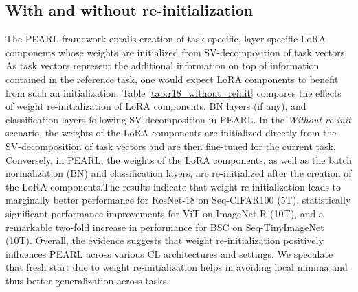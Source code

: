 \documentclass[10pt]{article} %
\begin{document}
\subsection{With and without re-initialization}\label{with_without_reinint} 
The PEARL framework entails creation of task-specific, layer-specific LoRA components whose weights are initialized from SV-decomposition of task vectors. As task vectors represent the additional information on top of information contained in the reference task, one would expect LoRA components to benefit from such an initialization. Table \ref{tab:r18_without_reinit} compares the effects of weight re-initialization of LoRA components, BN layers (if any), and classification layers following SV-decomposition in PEARL. In the \textit{Without re-init} scenario, the weights of the LoRA components are initialized directly from the SV-decomposition of task vectors and are then fine-tuned for the current task. Conversely, in PEARL, the weights of the LoRA components, as well as the batch normalization (BN) and classification layers, are re-initialized after the creation of the LoRA components.The results indicate that weight re-initialization leads to marginally better performance for ResNet-18 on Seq-CIFAR100 (5T), statistically significant performance improvements for ViT on ImageNet-R (10T), and a remarkable two-fold increase in performance for BSC on Seq-TinyImageNet (10T). Overall, the evidence suggests that weight re-initialization positively influences PEARL across various CL architectures and settings. We speculate that fresh start due to weight re-initialization helps in avoiding local minima and thus better generalization across tasks. 

\end{document}
